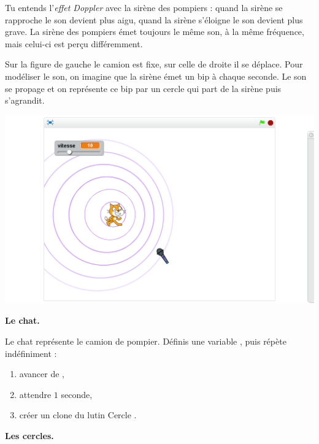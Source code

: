 \documentclass[class=report,crop=false, 12pt]{standalone}
\begin{document}
\begin{activite}

Tu entends l'\emph{effet Doppler} avec la sirène des pompiers : quand la sirène se rapproche le son devient plus aigu, quand la sirène s'éloigne le son devient plus grave.
La sirène des pompiers émet toujours le même son, à la même fréquence, mais celui-ci est perçu différemment. 


Sur la figure de gauche le camion est fixe, sur celle de droite il se déplace.
Pour modéliser le son, on imagine que la sirène émet un \og bip \fg{} à chaque seconde.
Le son se propage et on représente ce \og bip \fg{} par un cercle qui part de la sirène puis s'agrandit.

\begin{center}
  \includegraphics[scale=\scaleecran]{ecran-09-ex3} 
\end{center}


\bigskip

\textbf{Le chat.}

Le chat représente le camion de pompier.
Définis une variable , puis répète indéfiniment :

\begin{enumerate}
  \item avancer de ,
  \item attendre $1$ seconde,
  \item créer un clone du lutin \og Cercle \fg{}.
\end{enumerate}

\bigskip

\textbf{Les cercles.}


\end{activite}
\end{document}
